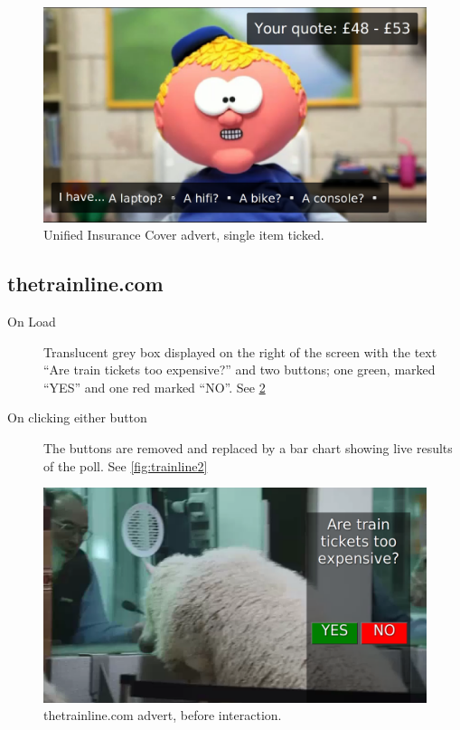	\begin{figure}[th]
		\centering
		\includegraphics[width=\textwidth,height=0.5\textheight,keepaspectratio]{images/adverts/unified_insurance_cover-7.png}
		\caption{Unified Insurance Cover advert, single item ticked.}
		\label{fig:Paddy7}
	\end{figure}

\clearpage
\subsection{thetrainline.com}
	\begin{description}
		\item[On Load]{Translucent grey box displayed on the right of the screen with the text ``Are train tickets too expensive?'' and two buttons; one green, marked ``YES'' and one red marked ``NO''. See \ref{fig:trainline1}}
		\item[On clicking either button]{The buttons are removed and replaced by a bar chart showing live results of the poll. See \ref{fig:trainline2}}
	\end{description}

	\begin{figure}[th]
		\centering
		\includegraphics[width=\textwidth,height=0.5\textheight,keepaspectratio]{images/adverts/trainline-1.png}
		\caption{thetrainline.com advert, before interaction.}
		\label{fig:trainline1}
	\end{figure}

